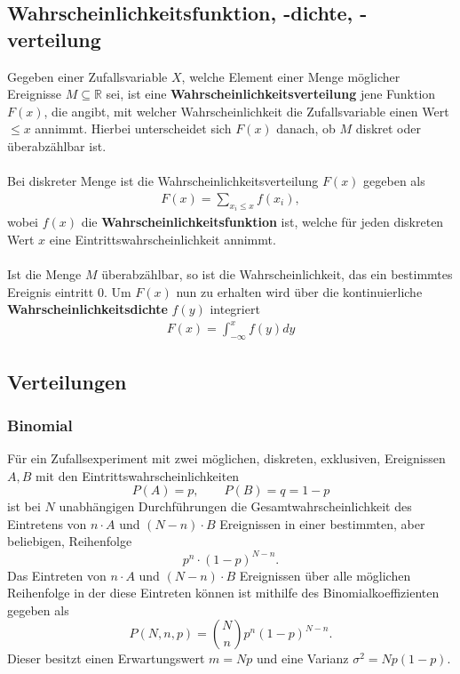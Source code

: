 \documentclass{article}
\begin{document}
	\subsection{Wahrscheinlichkeitsfunktion, -dichte, -verteilung}
	Gegeben einer Zufallsvariable $X$, welche Element einer Menge möglicher Ereignisse $M\subseteq\mathbb{R}$ sei, ist eine \textbf{Wahrscheinlichkeitsverteilung} jene Funktion $F(x)$, die angibt, mit welcher Wahrscheinlichkeit die Zufallsvariable einen Wert $\leq x$ annimmt. Hierbei unterscheidet sich $F(x)$ danach, ob $M$ diskret oder überabzählbar ist.\\\\
	Bei diskreter Menge ist die Wahrscheinlichkeitsverteilung $F(x)$ gegeben als\\
	\begin{gather}
	F(x)=\sum_{x_i\leq x}f(x_i),
	\end{gather}
	wobei $f(x)$ die \textbf{Wahrscheinlichkeitsfunktion} ist, welche für jeden diskreten Wert $x$ eine Eintrittswahrscheinlichkeit annimmt.\\\\
	Ist die Menge $M$ überabzählbar, so ist die Wahrscheinlichkeit, das ein bestimmtes Ereignis eintritt $0$. Um $F(x)$ nun zu erhalten wird über die kontinuierliche \textbf{Wahrscheinlichkeitsdichte} $f(y)$ integriert
	\begin{gather}
	F(x)=\int_{-\infty}^{x}f(y)dy
	\end{gather}   
	\subsection{Verteilungen}
	\subsubsection{Binomial}
	Für ein Zufallsexperiment mit zwei möglichen, diskreten, exklusiven, Ereignissen $A,B$ mit den Eintrittswahrscheinlichkeiten 
	\begin{equation}
	P(A)=p,\qquad P(B)=q=1-p
	\end{equation}
	ist bei $N$ unabhängigen Durchführungen die Gesamtwahrscheinlichkeit des Eintretens von $n\cdot A$ und $(N-n)\cdot B$ Ereignissen in einer bestimmten, aber beliebigen, Reihenfolge 
	\begin{equation}
	p^n\cdot(1-p)^{N-n}.
	\end{equation}
	Das Eintreten von $n\cdot A$ und $(N-n)\cdot B$ Ereignissen über alle möglichen Reihenfolge in der diese Eintreten können ist mithilfe des Binomialkoeffizienten gegeben als
	\begin{equation}
	P(N,n,p)=\binom{N}{n}p^n(1-p)^{N-n}.
	\end{equation}
	Dieser besitzt einen Erwartungswert $m=Np$ und eine Varianz $\sigma^2=Np(1-p)$.
\end{document}
